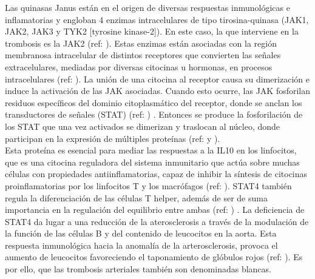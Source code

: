 		Las quinasas Janus están en el origen de diversas respuestas inmunológicas e inflamatorias y engloban 4 enzimas intracelulares de tipo tirosina-quinasa (JAK1, JAK2, JAK3 y TYK2 [tyrosine kinase-2]). En este caso, la que interviene en la trombosis es la JAK2 (ref: \cite{JAK2}). Estas enzimas están asociadas con la región membranosa intracelular de distintos receptores que convierten las señales extracelulares, mediadas por diversas citocinas u hormonas, en procesos intracelulares (ref: \cite{JAK2}). La unión de una citocina al receptor causa su dimerización e induce la activación de las JAK asociadas. Cuando esto ocurre, las JAK fosforilan residuos específicos del dominio citoplasmático del receptor, donde se anclan los transductores de señales (STAT) (ref: \cite{JAK2}) . Entonces se produce la fosforilación de los STAT que una vez activados se dimerizan y traslocan al núcleo, donde participan en la expresión de múltiples proteínas (ref: \cite{JAK2} y \cite{STAT4}).\\
		
		Esta proteína es esencial para mediar las respuestas a la IL10 en los linfocitos, que es una citocina reguladora del sistema inmunitario que actúa sobre muchas células con propiedades antiinflamatorias, capaz de inhibir la síntesis de citocinas proinflamatorias por los linfocitos T y los macrófagos (ref: \cite{IL10}). STAT4 también regula la diferenciación de las células T helper, además de ser de suma importancia en la regulación del equilibrio entre ambas (ref: \cite{STAT4}) . La deficiencia de STAT4 da lugar a una reducción de la aterosclerosis a través de la modulación de la función de las células B y del contenido de leucocitos en la aorta. Esta respuesta inmunológica hacia la anomalía de la arterosclerosis, provoca el aumento de leucocitos favoreciendo el taponamiento de glóbulos rojos (ref: \cite{STAT4}). Es por ello, que las trombosis arteriales también son denominadas blancas.\\

	
	

